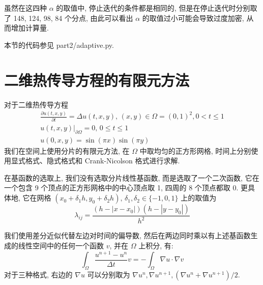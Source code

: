 \documentclass[UTF8]{article}
\begin{document}
    虽然在这四种 $\alpha$ 的取值中, 停止迭代的条件都是相同的, 但是在停止迭代时分别取了 148, 124, 98, 84 个分点, 由此可以看出 $\alpha$ 的取值过小可能会导致过度加密, 从而增加计算量.

    本节的代码参见 part2/adaptive.py.


    \section{二维热传导方程的有限元方法}

    对于二维热传导方程
    \begin{gather*}
        \frac{\partial u(t,x,y)}{\partial t} = \Delta u(t,x,y),\,(x,y)\in\Omega=(0,1)^2,0<t\le 1\\
        u(t,x,y)|_{\partial \Omega} = 0,\,0\le t \le 1\\
        u(0,x,y) = \sin(\pi x)\sin(\pi y)
    \end{gather*}
    我们在空间上使用分片的有限元方法, 在 $\Omega$ 中取均匀的正方形网格, 时间上分别使用显式格式、隐式格式和 Crank-Nicolson 格式进行求解.

    在基函数的选取上, 我们没有选取分片线性基函数, 而是选取了一个二次函数, 它在一个包含 9 个顶点的正方形网格中的中心顶点取 1, 四周的 8 个顶点都取 0.
    更具体地, 它在网格 $(x_0+\delta_1 h,y_0+\delta_2 h),\,\delta_1,\delta_2\in\{-1,0,1\}$ 上的取值为
    \[
        \lambda_{ij}=\frac{(h-| x-x_0 |)(h-| y-y_0 |)}{h^2}
    \]

    我们使用差分近似代替左边对时间的偏导数, 然后在两边同时乘以有上述基函数生成的线性空间中的任何一个函数 $v$, 并在 $\Omega$ 上积分, 有:
    \[
        \int_{\Omega} \frac{u^{n+1}-u^n}{\Delta t}v = -\int_{\Omega} \nabla u\cdot\nabla v
    \]
    对于三种格式, 右边的 $\nabla u$ 可以分别取为 $\nabla u^n, \nabla u^{n+1}, (\nabla u^n+\nabla u^{n+1})/2$.
\end{document}
